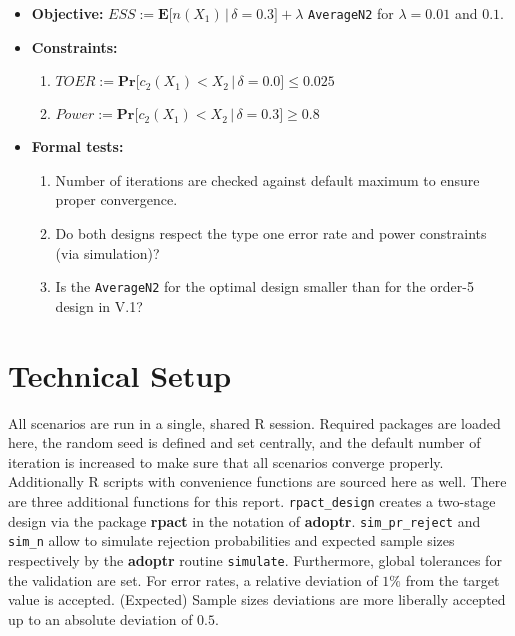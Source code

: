 \documentclass[]{book}
\providecommand{\tightlist}{%
  \setlength{\itemsep}{0pt}\setlength{\parskip}{0pt}}
\begin{document}
\begin{itemize}
\tightlist
\item
  \textbf{Objective:} \(ESS := \boldsymbol{E}\big[n(X_1)\,|\,\delta=0.3\big] + \lambda\) \texttt{AverageN2}
  for \(\lambda = 0.01\) and \(0.1\).
\item
  \textbf{Constraints:}

  \begin{enumerate}
  \def\labelenumi{\arabic{enumi}.}
  \tightlist
  \item
    \(TOER := \boldsymbol{Pr}\big[c_2(X_1) < X_2\,|\,\delta=0.0\big] \leq 0.025\)
  \item
    \(Power := \boldsymbol{Pr}\big[c_2(X_1) < X_2\,|\,\delta=0.3\big] \geq 0.8\)
  \end{enumerate}
\item
  \textbf{Formal tests:}

  \begin{enumerate}
  \def\labelenumi{\arabic{enumi}.}
  \tightlist
  \item
    Number of iterations are checked against default maximum to ensure proper
    convergence.
  \item
    Do both designs respect the type one error rate and power
    constraints (via simulation)?
  \item
    Is the \texttt{AverageN2} for the optimal design smaller than for the order-5
    design in V.1?
  \end{enumerate}
\end{itemize}

\hypertarget{technical-setup}{%
\section{Technical Setup}\label{technical-setup}}

All scenarios are run in a single, shared R session.
Required packages are loaded here,
the random seed is defined and set centrally, and the default number
of iteration is increased to make sure that all scenarios
converge properly.
Additionally R scripts with convenience functions are sourced here as well.
There are three additional functions for this report.
\texttt{rpact\_design} creates a two-stage design via the package \textbf{rpact} \citep{R-rpact}
in the notation of \textbf{adoptr}.
\texttt{sim\_pr\_reject} and \texttt{sim\_n} allow to simulate rejection probabilities
and expected sample sizes respectively by the \textbf{adoptr} routine \texttt{simulate}.
Furthermore, global tolerances for the validation are set.
For error rates, a relative deviation of \(1\%\) from the target value is
accepted.
(Expected) Sample sizes deviations are more liberally accepted up to an
absolute deviation of \(0.5\).
\end{document}
